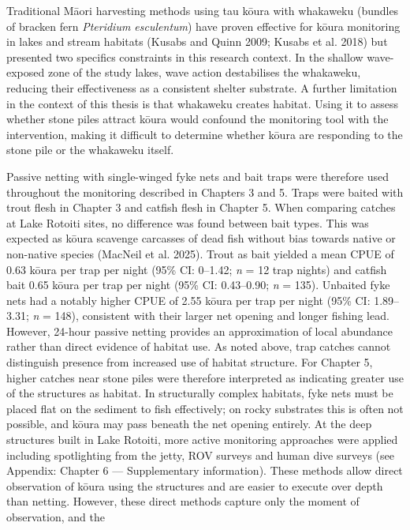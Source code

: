 \documentclass[
  12pt,
  a4paper,
  oneside]{scrbook}
\begin{document}
Traditional Māori harvesting methods using tau kōura with whakaweku
(bundles of bracken fern \emph{Pteridium esculentum}) have proven
effective for kōura monitoring in lakes and stream habitats (Kusabs and
Quinn 2009; Kusabs et al. 2018) but presented two specifics constraints
in this research context. In the shallow wave-exposed zone of the study
lakes, wave action destabilises the whakaweku, reducing their
effectiveness as a consistent shelter substrate. A further limitation in
the context of this thesis is that whakaweku creates habitat. Using it
to assess whether stone piles attract kōura would confound the
monitoring tool with the intervention, making it difficult to determine
whether kōura are responding to the stone pile or the whakaweku itself.

Passive netting with single-winged fyke nets and bait traps were
therefore used throughout the monitoring described in Chapters 3 and 5.
Traps were baited with trout flesh in Chapter 3 and catfish flesh in
Chapter 5. When comparing catches at Lake Rotoiti sites, no difference
was found between bait types. This was expected as kōura scavenge
carcasses of dead fish without bias towards native or non-native species
(MacNeil et al. 2025). Trout as bait yielded a mean CPUE of 0.63 kōura
per trap per night (95\% CI: 0--1.42; \emph{n} = 12 trap nights) and
catfish bait 0.65 kōura per trap per night (95\% CI: 0.43--0.90;
\emph{n} = 135). Unbaited fyke nets had a notably higher CPUE of 2.55
kōura per trap per night (95\% CI: 1.89--3.31; \emph{n} = 148),
consistent with their larger net opening and longer fishing lead.
However, 24-hour passive netting provides an approximation of local
abundance rather than direct evidence of habitat use. As noted above,
trap catches cannot distinguish presence from increased use of habitat
structure. For Chapter 5, higher catches near stone piles were therefore
interpreted as indicating greater use of the structures as habitat. In
structurally complex habitats, fyke nets must be placed flat on the
sediment to fish effectively; on rocky substrates this is often not
possible, and kōura may pass beneath the net opening entirely. At the
deep structures built in Lake Rotoiti, more active monitoring approaches
were applied including spotlighting from the jetty, ROV surveys and
human dive surveys (see Appendix: Chapter 6 --- Supplementary
information). These methods allow direct observation of kōura using the
structures and are easier to execute over depth than netting. However,
these direct methods capture only the moment of observation, and the
\end{document}
